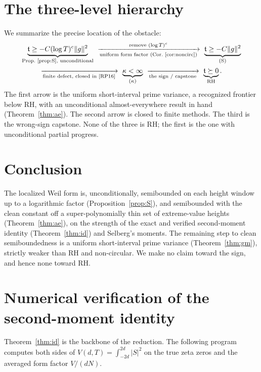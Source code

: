 \documentclass[11pt]{amsart}
\theoremstyle{definition}
\theoremstyle{remark}
\newcommand{\ft}{\mathfrak t}
\newcommand{\RH}{\mathrm{RH}}
\begin{document}
\section{The three-level hierarchy}
We summarize the precise location of the obstacle:
\begin{multline*}
\underbrace{\ft\ge-C(\log T)^c\|g\|^2}_{\text{Prop.~\ref{prop:S}, unconditional}}
\ \xrightarrow[\text{uniform form factor (Cor.~\ref{cor:noncirc})}]{\text{remove }(\log T)^c}\
\underbrace{\ft\ge-C\|g\|^2}_{(\mathrm S)}\\
\xrightarrow[\text{finite defect, closed in~\cite{RP16}}]{}\
\underbrace{\kappa<\infty}_{(\kappa)}\
\xrightarrow[\text{the sign / capstone}]{}\
\underbrace{\ft\succeq0}_{\RH}.
\end{multline*}
The first arrow is the uniform short-interval prime variance, a recognized
frontier below RH, with an unconditional almost-everywhere result in hand
(Theorem~\ref{thm:ae}). The second arrow is closed to finite methods. The third
is the wrong-sign capstone. None of the three is RH; the first is the one with
unconditional partial progress.

\section{Conclusion}
The localized Weil form is, unconditionally, semibounded on each height window up
to a logarithmic factor (Proposition~\ref{prop:S}), and semibounded with the
clean constant off a super-polynomially thin set of extreme-value heights
(Theorem~\ref{thm:ae}), on the strength of the exact and verified second-moment
identity (Theorem~\ref{thm:id}) and Selberg's moments. The remaining step to clean
semiboundedness is a uniform short-interval prime variance (Theorem~\ref{thm:gm}),
strictly weaker than RH and non-circular. We make no claim toward the sign, and
hence none toward RH.

\appendix
\section{Numerical verification of the second-moment identity}\label{app:code}
Theorem~\ref{thm:id} is the backbone of the reduction. The following program
computes both sides of $V(d,T)=\int_{-2d}^{2d}|S|^2$ on the true zeta zeros and
the averaged form factor $V/(dN)$.


\end{document}
